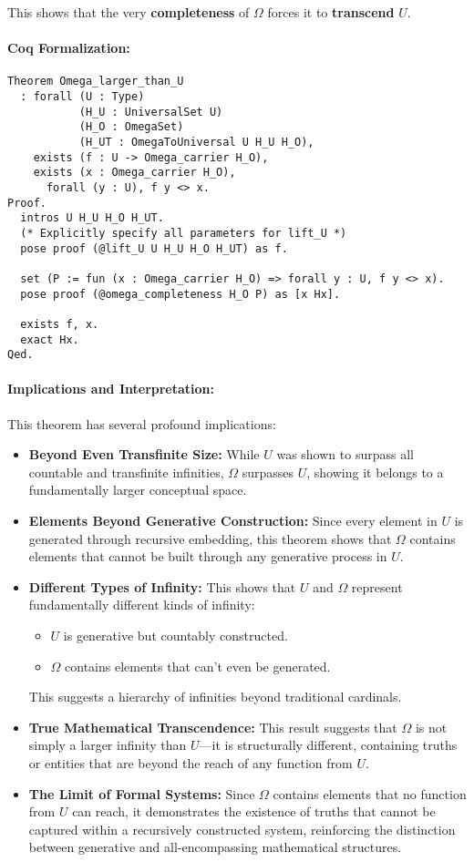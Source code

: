 \documentclass[12pt]{article}
\begin{document}
This shows that the very \textbf{completeness} of \( \Omega \) forces it to \textbf{transcend} \( U \).

\paragraph{Coq Formalization:}
\begin{lstlisting}[language=Coq]
Theorem Omega_larger_than_U
  : forall (U : Type)
           (H_U : UniversalSet U)
           (H_O : OmegaSet)
           (H_UT : OmegaToUniversal U H_U H_O),
    exists (f : U -> Omega_carrier H_O),
    exists (x : Omega_carrier H_O),
      forall (y : U), f y <> x.
Proof.
  intros U H_U H_O H_UT.
  (* Explicitly specify all parameters for lift_U *)
  pose proof (@lift_U U H_U H_O H_UT) as f.
  
  set (P := fun (x : Omega_carrier H_O) => forall y : U, f y <> x).
  pose proof (@omega_completeness H_O P) as [x Hx].

  exists f, x.
  exact Hx.
Qed.
\end{lstlisting}

\paragraph{Implications and Interpretation:}
This theorem has several profound implications:

\begin{itemize}
    \item \textbf{Beyond Even Transfinite Size:} While \( U \) was shown to surpass all countable and transfinite infinities, \( \Omega \) surpasses \( U \), showing it belongs to a fundamentally larger conceptual space.
    \item \textbf{Elements Beyond Generative Construction:} Since every element in \( U \) is generated through recursive embedding, this theorem shows that \( \Omega \) contains elements that cannot be built through any generative process in \( U \).
    \item \textbf{Different Types of Infinity:} This shows that \( U \) and \( \Omega \) represent fundamentally different kinds of infinity:
    \begin{itemize}
        \item \( U \) is generative but countably constructed.
        \item \( \Omega \) contains elements that can’t even be generated.
    \end{itemize}
    This suggests a hierarchy of infinities beyond traditional cardinals.
    \item \textbf{True Mathematical Transcendence:} This result suggests that \( \Omega \) is not simply a larger infinity than \( U \)—it is structurally different, containing truths or entities that are beyond the reach of any function from \( U \).
    \item \textbf{The Limit of Formal Systems:} Since \( \Omega \) contains elements that no function from \( U \) can reach, it demonstrates the existence of truths that cannot be captured within a recursively constructed system, reinforcing the distinction between generative and all-encompassing mathematical structures.
\end{itemize}
\end{document}
